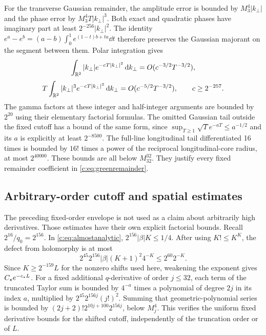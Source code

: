 For the transverse Gaussian remainder, the amplitude error is
bounded by $M_3^4|k_\perp|$ and the phase error by $M_3^4T|k_\perp|^3$.
Both exact and quadratic phases have imaginary part at least
$2^{-256}|k_\perp|^2$. The identity
$e^a-e^b=(a-b)\int_0^1e^{(1-t)b+ta}\dd t$ therefore preserves
the Gaussian majorant on the segment between them. Polar
integration gives
\[
 \int_{\mathbb R^2}|k_\perp|e^{-cT|k_\perp|^2}\,\mathrm d k_\perp=O(c^{-3/2}T^{-3/2}),
\]
\[
 T\int_{\mathbb R^2}|k_\perp|^3e^{-cT|k_\perp|^2}\,\mathrm d k_\perp
       =O(c^{-5/2}T^{-3/2}),\qquad c\ge2^{-257}.
\]
The gamma factors at these integer and half-integer arguments are
bounded by $2^{20}$ using their elementary factorial formulas.
The omitted Gaussian tail outside the fixed cutoff has a bound
of the same form, since $\sup_{T\ge1}\sqrt T e^{-aT}\le a^{-1/2}$
and its $a$ is explicitly at least $2^{-8500}$.
The full-line longitudinal tail differentiated 16 times is bounded
by $16!$ times a power of the reciprocal longitudinal-core radius,
at most $2^{40000}$. These bounds are all below $M_{32}^{32}$.
They justify every fixed remainder coefficient in
\eqref{c:eq:greenremainder}.

\subsection{Arbitrary-order cutoff and spatial estimates}
The preceding fixed-order envelope is not used as a claim about
arbitrarily high derivatives. Those estimates have their own explicit
factorial bounds. Recall $2^{16}/q_0=2^{156}$. In
\eqref{c:eq:almostanalytic}, $2^{156}|\beta|K\le1/4$. After using
$K!\le K^K$, the defect from holomorphy is at most
\[
 2^{45}2^{156}|\beta|(K+1)^2 4^{-K}
 \le2^{60}2^{-K}.
\]
Since $K\ge2^{-159}L$ for the nonzero shifts used here, weakening
the exponent gives $C_\star e^{-c_\star L}$. For a fixed additional
$q$-derivative of order $j\le32$, each term of the truncated
Taylor sum is bounded by $4^{-a}$ times a polynomial of degree
$2j$ in its index $a$, multiplied by
$2^{45}2^{156j}(j!)^2$. Summing that geometric-polynomial series is
bounded by $(2j+2)!2^{10j+100}2^{156j}$, below $M_j^4$.
This verifies the uniform fixed derivative bounds for the shifted
cutoff, independently of the truncation order or of $L$.

